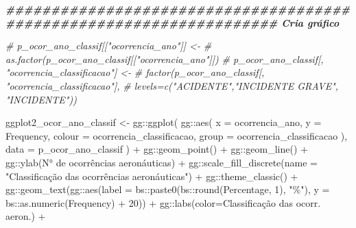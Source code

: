 \documentclass[
]{article}
\newenvironment{Shaded}{\begin{snugshade}}{\end{snugshade}}
\newcommand{\AttributeTok}[1]{\textcolor[rgb]{0.77,0.63,0.00}{#1}}
\newcommand{\CommentTok}[1]{\textcolor[rgb]{0.56,0.35,0.01}{\textit{#1}}}
\newcommand{\DecValTok}[1]{\textcolor[rgb]{0.00,0.00,0.81}{#1}}
\newcommand{\DocumentationTok}[1]{\textcolor[rgb]{0.56,0.35,0.01}{\textbf{\textit{#1}}}}
\newcommand{\FunctionTok}[1]{\textcolor[rgb]{0.00,0.00,0.00}{#1}}
\newcommand{\NormalTok}[1]{#1}
\newcommand{\OtherTok}[1]{\textcolor[rgb]{0.56,0.35,0.01}{#1}}
\newcommand{\SpecialCharTok}[1]{\textcolor[rgb]{0.00,0.00,0.00}{#1}}
\newcommand{\StringTok}[1]{\textcolor[rgb]{0.31,0.60,0.02}{#1}}
\begin{document}
\begin{Shaded}
\begin{Highlighting}[]
\DocumentationTok{\#\#\#\#\#\#\#\#\#\#\#\#\#\#\#\#\#\#\#\#\#\#\#\#\#\#\#\#\#\#\#\#\#\#\#\#\#\#\#\#\#\#\#\#\#\#\#\#\#\#\#\#\#\#\#\#\#\#\#\#\#\#\#\#\#\#\#\# Cria gráfico}

\CommentTok{\# p\_ocor\_ano\_classif[["ocorrencia\_ano"]] \textless{}{-}}
\CommentTok{\#     as.factor(p\_ocor\_ano\_classif[["ocorrencia\_ano"]])}
\CommentTok{\# p\_ocor\_ano\_classif[, "ocorrencia\_classificacao"] \textless{}{-}}
\CommentTok{\#     factor(p\_ocor\_ano\_classif[, "ocorrencia\_classificacao"],}
\CommentTok{\#                    levels=c("ACIDENTE","INCIDENTE GRAVE", "INCIDENTE"))}

\NormalTok{ggplot2\_ocor\_ano\_classif }\OtherTok{\textless{}{-}}\NormalTok{ gg}\SpecialCharTok{::}\FunctionTok{ggplot}\NormalTok{(}
\NormalTok{    gg}\SpecialCharTok{::}\FunctionTok{aes}\NormalTok{(}
        \AttributeTok{x =}\NormalTok{ ocorrencia\_ano,}
        \AttributeTok{y =}\NormalTok{ Frequency,}
        \AttributeTok{colour =}\NormalTok{ ocorrencia\_classificacao,}
        \AttributeTok{group =}\NormalTok{ ocorrencia\_classificacao}
\NormalTok{    ),}
    \AttributeTok{data =}\NormalTok{ p\_ocor\_ano\_classif}
\NormalTok{) }\SpecialCharTok{+}
\NormalTok{    gg}\SpecialCharTok{::}\FunctionTok{geom\_point}\NormalTok{() }\SpecialCharTok{+}
\NormalTok{    gg}\SpecialCharTok{::}\FunctionTok{geom\_line}\NormalTok{() }\SpecialCharTok{+}
\NormalTok{    gg}\SpecialCharTok{::}\FunctionTok{ylab}\NormalTok{(}\StringTok{\textquotesingle{}N° de ocorrências aeronáuticas\textquotesingle{}}\NormalTok{) }\SpecialCharTok{+}
\NormalTok{    gg}\SpecialCharTok{::}\FunctionTok{scale\_fill\_discrete}\NormalTok{(}\AttributeTok{name =} \StringTok{"Classificação das ocorrências aeronáuticas"}\NormalTok{) }\SpecialCharTok{+}
\NormalTok{    gg}\SpecialCharTok{::}\FunctionTok{theme\_classic}\NormalTok{() }\SpecialCharTok{+}
\NormalTok{    gg}\SpecialCharTok{::}\FunctionTok{geom\_text}\NormalTok{(gg}\SpecialCharTok{::}\FunctionTok{aes}\NormalTok{(}\AttributeTok{label =}\NormalTok{ bs}\SpecialCharTok{::}\FunctionTok{paste0}\NormalTok{(bs}\SpecialCharTok{::}\FunctionTok{round}\NormalTok{(Percentage, }\DecValTok{1}\NormalTok{), }\StringTok{"\%"}\NormalTok{),}
                                    \AttributeTok{y =}\NormalTok{ bs}\SpecialCharTok{::}\FunctionTok{as.numeric}\NormalTok{(Frequency) }\SpecialCharTok{+} \DecValTok{20}\NormalTok{)) }\SpecialCharTok{+}
\NormalTok{    gg}\SpecialCharTok{::}\FunctionTok{labs}\NormalTok{(}\AttributeTok{color=}\StringTok{\textquotesingle{}Classificação das ocorr. aeron.\textquotesingle{}}\NormalTok{) }\SpecialCharTok{+}

\end{Highlighting}
\end{Shaded}
\end{document}
